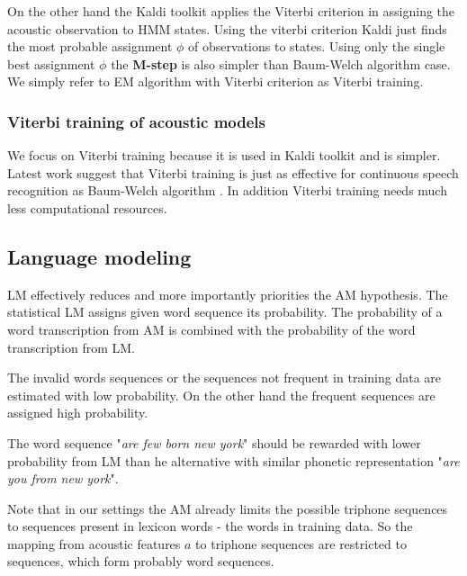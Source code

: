 {
On the other hand the Kaldi toolkit applies the Viterbi 
criterion in assigning the acoustic observation to \ac{HMM} states.
Using the viterbi criterion Kaldi just finds 
the most probable assignment $\phi$ of observations to states.\cite{buthpitiya2012parallel}
Using only the single best assignment $\phi$ the {\bf M-step} is also simpler than
Baum-Welch algorithm case.
We simply refer to \ac{EM} algorithm with Viterbi criterion as Viterbi training.

\subsubsection*{Viterbi training of acoustic models}
We focus on Viterbi training because it is used in Kaldi toolkit and is simpler.
Latest work suggest that Viterbi training is just as effective for continuous
speech recognition as Baum-Welch algorithm \cite{rodriguez2003comparative}.
In addition Viterbi training needs much less computational resources. 




\subsection{Language modeling}
\label{sub:lm}

\ac{LM} effectively reduces and more importantly priorities the \ac{AM} hypothesis.
The statistical \ac{LM} assigns given word sequence its probability.
The probability of a word transcription from \ac{AM} is combined with
the probability of the word transcription from \ac{LM}.

The invalid words sequences or the sequences not frequent in training data
are estimated with low probability. On the other hand the frequent sequences
are assigned high probability.

The word sequence "{\it are few born new york}" should be rewarded 
with lower probability from \ac{LM} than he alternative with similar phonetic representation
"{\it are you from new york}".

Note that in our settings the \ac{AM} already limits the possible triphone
sequences to sequences present in lexicon words - the words in training data.
So the mapping from acoustic features $a$ to triphone sequences
are restricted to sequences, which form probably word sequences.

}
